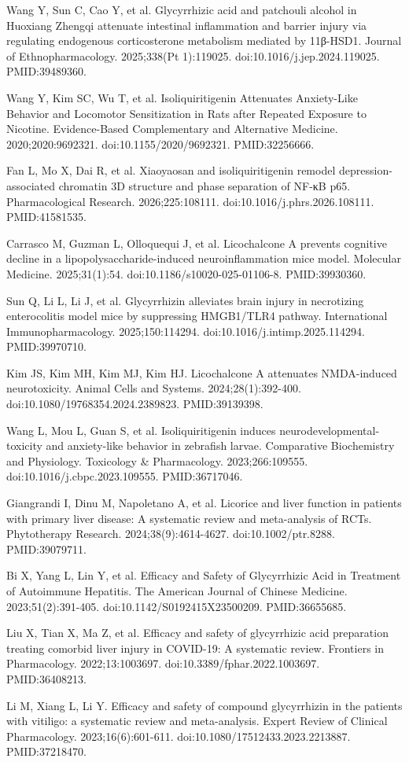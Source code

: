 \documentclass[11pt,oneside]{book}
\newcommand{\reff}[2]{\par\hangindent=7mm\hangafter=1\noindent[#1]\hspace{2mm}#2\par}
\begin{document}
\reff{22}{Wang Y, Sun C, Cao Y, et al. Glycyrrhizic acid and patchouli alcohol in Huoxiang Zhengqi attenuate intestinal inflammation and barrier injury via regulating endogenous corticosterone metabolism mediated by 11β-HSD1. Journal of Ethnopharmacology. 2025;338(Pt 1):119025. doi:10.1016/j.jep.2024.119025. PMID:39489360.}
\reff{23}{Wang Y, Kim SC, Wu T, et al. Isoliquiritigenin Attenuates Anxiety-Like Behavior and Locomotor Sensitization in Rats after Repeated Exposure to Nicotine. Evidence-Based Complementary and Alternative Medicine. 2020;2020:9692321. doi:10.1155/2020/9692321. PMID:32256666.}
\reff{24}{Fan L, Mo X, Dai R, et al. Xiaoyaosan and isoliquiritigenin remodel depression-associated chromatin 3D structure and phase separation of NF-κB p65. Pharmacological Research. 2026;225:108111. doi:10.1016/j.phrs.2026.108111. PMID:41581535.}
\reff{25}{Carrasco M, Guzman L, Olloquequi J, et al. Licochalcone A prevents cognitive decline in a lipopolysaccharide-induced neuroinflammation mice model. Molecular Medicine. 2025;31(1):54. doi:10.1186/s10020-025-01106-8. PMID:39930360.}
\reff{26}{Sun Q, Li L, Li J, et al. Glycyrrhizin alleviates brain injury in necrotizing enterocolitis model mice by suppressing HMGB1/TLR4 pathway. International Immunopharmacology. 2025;150:114294. doi:10.1016/j.intimp.2025.114294. PMID:39970710.}
\reff{27}{Kim JS, Kim MH, Kim MJ, Kim HJ. Licochalcone A attenuates NMDA-induced neurotoxicity. Animal Cells and Systems. 2024;28(1):392-400. doi:10.1080/19768354.2024.2389823. PMID:39139398.}
\reff{28}{Wang L, Mou L, Guan S, et al. Isoliquiritigenin induces neurodevelopmental-toxicity and anxiety-like behavior in zebrafish larvae. Comparative Biochemistry and Physiology. Toxicology \& Pharmacology. 2023;266:109555. doi:10.1016/j.cbpc.2023.109555. PMID:36717046.}
\reff{29}{Giangrandi I, Dinu M, Napoletano A, et al. Licorice and liver function in patients with primary liver disease: A systematic review and meta-analysis of RCTs. Phytotherapy Research. 2024;38(9):4614-4627. doi:10.1002/ptr.8288. PMID:39079711.}
\reff{30}{Bi X, Yang L, Lin Y, et al. Efficacy and Safety of Glycyrrhizic Acid in Treatment of Autoimmune Hepatitis. The American Journal of Chinese Medicine. 2023;51(2):391-405. doi:10.1142/S0192415X23500209. PMID:36655685.}
\reff{31}{Liu X, Tian X, Ma Z, et al. Efficacy and safety of glycyrrhizic acid preparation treating comorbid liver injury in COVID-19: A systematic review. Frontiers in Pharmacology. 2022;13:1003697. doi:10.3389/fphar.2022.1003697. PMID:36408213.}
\reff{32}{Li M, Xiang L, Li Y. Efficacy and safety of compound glycyrrhizin in the patients with vitiligo: a systematic review and meta-analysis. Expert Review of Clinical Pharmacology. 2023;16(6):601-611. doi:10.1080/17512433.2023.2213887. PMID:37218470.}
\end{document}
